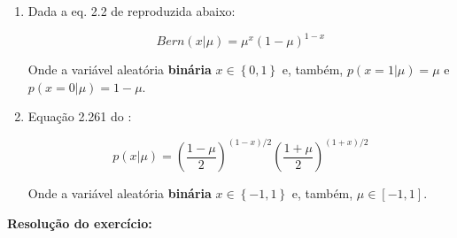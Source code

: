 \documentclass{article}
\begin{document}
  \begin{enumerate}
  	\item  Dada  a eq. 2.2 de \cite{Bishop2006} reproduzida abaixo:
  	
  	\begin{equation}
  		Bern (x|\mu) = \mu^{x}(1-\mu)^{1-x}
  	\end{equation}
  	
  	Onde a variável aleatória \textbf{binária} $x \in \left\{ 0,1 \right\} $ e, também, $p(x=1|\mu)=\mu$ e $p(x=0|\mu)=1-\mu$. 
  	
  	\item Equação 2.261 do \cite{Bishop2006}:
  	
  	  \begin{equation}
  	  	 p(x|\mu) = \left(\frac{1-\mu}{2}\right)^{(1-x)/2}\left(\frac{1+\mu}{2}\right)^{(1+x)/2}
  	  \end{equation}
  	
  		Onde a variável aleatória \textbf{binária} $x \in \left\{ -1,1 \right\} $ e, também, $\mu \in \left[-1,1  \right]$. 
  
  \end{enumerate}
   
   \textbf{Resolução do exercício:}
   
\end{document}
